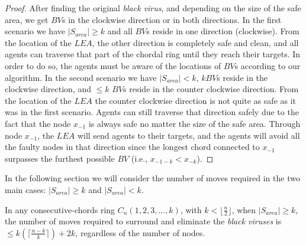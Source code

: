 \begin{proof}
After finding the original {\it black virus}, and depending on the size of the safe area, we get $BV$s in the clockwise direction or in both directions. In the first scenario we have $|S_{area}|\ge k$ and all $BV$s reside in one direction (clockwise). From the location of the $LEA$, the other direction is completely safe and clean,   and all agents can  traverse that part of the chordal ring until they reach their targets. In order to do so, the agents must be aware of the locations of $BV$s according to our algorithm. 
In the second scenario we have  $|S_{area}|< k$, $ k$$BV$s reside in the clockwise direction, and $\leq k$ $BV$s reside in the counter clockwise direction. From the location of the $LEA$ the counter clockwise direction is not quite as safe as it was in the first scenario. Agents can still traverse that direction safely due to the fact that the node $x_{-1}$ is always safe no matter the size of the safe area. Through node $x_{-1}$, the $LEA$ will send agents to their targets, and the agents will avoid all the faulty nodes in that direction since the longest chord connected to $x_{-1}$ surpasses the furthest possible $BV$ (i.e., $x_{-1-k} < x_{-k}$).

\end{proof}

In the following section we will consider the number of moves required  in the two main cases: $|S_{area}|\ge k$ and  $|S_{area}|< k$.
\begin{theorem}
In any consecutive-chords ring $C_n(1,2,3,...,k)$, with  $ k  < \lfloor\frac{n}{2}\rfloor$, when $|S_{area}|\ge k$, the number of moves required to surround and eliminate the {\it black viruses} is $\leq k(\lceil \frac {n-k}{k} \rceil) +2k$, regardless of the number of nodes.
\end{theorem}



